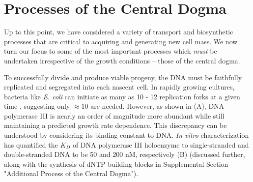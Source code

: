 \section{Processes of the Central Dogma}
Up to this point, we have considered a variety of transport and biosynthetic
processes that are critical to acquiring and generating new cell mass. We now
turn our focus to some of the most important processes which \textit{must} be
undertaken irrespective of the growth conditions -- those of the central dogma.

To successfully divide and produce viable progeny, the DNA must be faithfully
replicated and segregated into each nascent cell. In rapidly growing cultures,
bacteria like \textit{E. coli} can initiate as many as 10 - 12 replication forks
at a given time \citep{bremer2008, si2017}, suggesting  only $\approx 10$ are
needed. However, as shown in (A), DNA polymerase III is
nearly an order of magnitude more abundant while still maintaining a predicted
growth rate dependence. This discrepancy can be understood by considering its
binding constant to DNA. \textit{In vitro} characterization has quantified the
$K_D$ of DNA polymerase III holoenzyme to single-stranded and double-stranded
DNA to be 50 and 200 nM, respectively \citep{ason2000} (B)
(discussed further, along with the synthesis of dNTP building blocks in Supplemental
Section "Additional Process of the Central Dogma").

